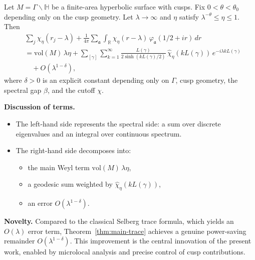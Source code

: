 \begin{theorem}\label{thm:main-trace}
Let $M=\Gamma\backslash\mathbb{H}$ be a finite-area hyperbolic surface with cusps.  
Fix $0<\theta<\theta_0$ depending only on the cusp geometry.  
Let $\lambda\to\infty$ and $\eta$ satisfy $\lambda^{-\theta}\leq \eta \leq 1$.  
Then
\begin{align*}
  &\sum_j \chi_\eta(r_j-\lambda)
   + \frac{1}{4\pi}\sum_{\mathfrak{a}}
     \int_{\mathbb{R}} \chi_\eta(r-\lambda)\,\varphi_\mathfrak{a}(1/2+ir)\, dr \\
  &= \mathrm{vol}(M)\,\lambda\eta
   + \sum_{[\gamma]} \sum_{k=1}^\infty
     \frac{L(\gamma)}{2\sinh(kL(\gamma)/2)}\, \widehat{\chi}_\eta(kL(\gamma))\,
     e^{-i\lambda kL(\gamma)} \\
  &\quad + O(\lambda^{1-\delta}),
\end{align*}
where $\delta>0$ is an explicit constant depending only on $\Gamma$, cusp geometry, the spectral gap $\beta$, and the cutoff $\chi$.
\end{theorem}

\medskip

\noindent\textbf{Discussion of terms.}
\begin{itemize}
  \item The left-hand side represents the spectral side: a sum over discrete eigenvalues and an integral over continuous spectrum.
  \item The right-hand side decomposes into:
  \begin{itemize}
    \item the main Weyl term $\mathrm{vol}(M)\,\lambda\eta$,
    \item a geodesic sum weighted by $\widehat{\chi}_\eta(kL(\gamma))$,
    \item an error $O(\lambda^{1-\delta})$.
  \end{itemize}
\end{itemize}

\medskip

\noindent\textbf{Novelty.}
Compared to the classical Selberg trace formula, which yields an $O(\lambda)$ error term, Theorem~\ref{thm:main-trace} achieves a genuine power-saving remainder $O(\lambda^{1-\delta})$.  
This improvement is the central innovation of the present work, enabled by microlocal analysis and precise control of cusp contributions.

\medskip

